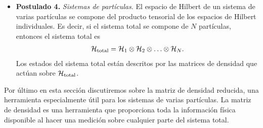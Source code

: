 \begin{itemize}
	\item[] \textbf{Postulado 4.} \textit{Sistemas de partículas.}
	El espacio de Hilbert de un sistema 	de varias partículas se compone del
	producto tensorial de los espacios de Hilbert 	individuales.
	Es decir, si el sistema total se compone de $N$ partículas, 
	entonces el sistema total es
	\begin{align}
		\mathcal{H}_{\text{total}} = \mathcal{H}_1\otimes \mathcal{H}_2 \otimes \ldots \otimes \mathcal{H}_N.
	\end{align}
	Los estados del sistema total están descritos por las matrices de 
	densidad que actúan sobre $\mathcal{H} _{\text{total}}$.
\end{itemize}

Por último en esta sección discutiremos sobre la matriz de densidad
reducida, una herramienta especialmente útil para los sistemas 
de varias partículas. La matriz de densidad es una herramienta 
que proporciona toda la información física disponible al hacer 
una medición sobre cualquier parte del sistema total. 

